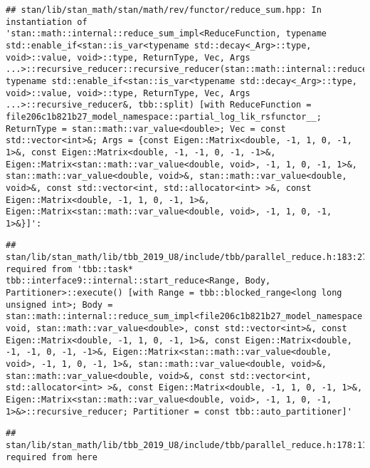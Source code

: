 \documentclass[
]{article}
\begin{document}
\begin{verbatim}
## stan/lib/stan_math/stan/math/rev/functor/reduce_sum.hpp: In instantiation of 'stan::math::internal::reduce_sum_impl<ReduceFunction, typename std::enable_if<stan::is_var<typename std::decay<_Arg>::type, void>::value, void>::type, ReturnType, Vec, Args ...>::recursive_reducer::recursive_reducer(stan::math::internal::reduce_sum_impl<ReduceFunction, typename std::enable_if<stan::is_var<typename std::decay<_Arg>::type, void>::value, void>::type, ReturnType, Vec, Args ...>::recursive_reducer&, tbb::split) [with ReduceFunction = file206c1b821b27_model_namespace::partial_log_lik_rsfunctor__; ReturnType = stan::math::var_value<double>; Vec = const std::vector<int>&; Args = {const Eigen::Matrix<double, -1, 1, 0, -1, 1>&, const Eigen::Matrix<double, -1, -1, 0, -1, -1>&, Eigen::Matrix<stan::math::var_value<double, void>, -1, 1, 0, -1, 1>&, stan::math::var_value<double, void>&, stan::math::var_value<double, void>&, const std::vector<int, std::allocator<int> >&, const Eigen::Matrix<double, -1, 1, 0, -1, 1>&, Eigen::Matrix<stan::math::var_value<double, void>, -1, 1, 0, -1, 1>&}]':
\end{verbatim}

\begin{verbatim}
## stan/lib/stan_math/lib/tbb_2019_U8/include/tbb/parallel_reduce.h:183:27:   required from 'tbb::task* tbb::interface9::internal::start_reduce<Range, Body, Partitioner>::execute() [with Range = tbb::blocked_range<long long unsigned int>; Body = stan::math::internal::reduce_sum_impl<file206c1b821b27_model_namespace::partial_log_lik_rsfunctor__, void, stan::math::var_value<double>, const std::vector<int>&, const Eigen::Matrix<double, -1, 1, 0, -1, 1>&, const Eigen::Matrix<double, -1, -1, 0, -1, -1>&, Eigen::Matrix<stan::math::var_value<double, void>, -1, 1, 0, -1, 1>&, stan::math::var_value<double, void>&, stan::math::var_value<double, void>&, const std::vector<int, std::allocator<int> >&, const Eigen::Matrix<double, -1, 1, 0, -1, 1>&, Eigen::Matrix<stan::math::var_value<double, void>, -1, 1, 0, -1, 1>&>::recursive_reducer; Partitioner = const tbb::auto_partitioner]'
\end{verbatim}

\begin{verbatim}
## stan/lib/stan_math/lib/tbb_2019_U8/include/tbb/parallel_reduce.h:178:11:   required from here
\end{verbatim}
\end{document}
